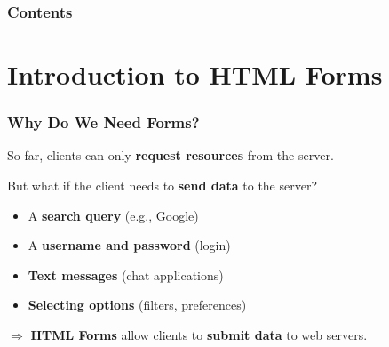 \documentclass[xcolor=table]{beamer}
\title[\asignatura]{\asignatura}
\subtitle{\grado}
\author{URJC}
\institute{GSyC}
\date{Course \curso}
\begin{document}
\frame{
\maketitle
}

\begin{frame}
\frametitle{Contents}
\tableofcontents
\end{frame}


\section{Introduction to HTML Forms}

\begin{frame}
\frametitle{Why Do We Need Forms?}

So far, clients can only \textbf{request resources} from the server.

\vspace{0.3cm}

But what if the client needs to \textbf{send data} to the server?

\vspace{0.3cm}

\begin{itemize}
\item A \textbf{search query} (e.g., Google)
\item A \textbf{username and password} (login)
\item \textbf{Text messages} (chat applications)
\item \textbf{Selecting options} (filters, preferences)
\end{itemize}

\vspace{0.4cm}

\begin{center}
$\Rightarrow$ \textbf{HTML Forms} allow clients to \textbf{submit data} to web servers.
\end{center}

\end{frame}
\end{document}

